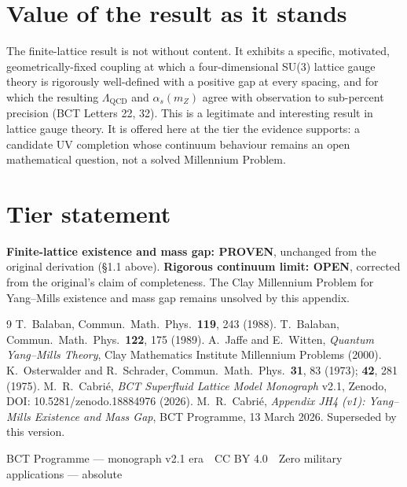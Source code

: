 \documentclass[twocolumn,10pt,a4paper]{article}
\begin{document}
\section{Value of the result as it stands}

The finite-lattice result is not without content. It exhibits a specific,
motivated, geometrically-fixed coupling at which a four-dimensional SU(3)
lattice gauge theory is rigorously well-defined with a positive gap at every
spacing, and for which the resulting $\Lambda_{\mathrm{QCD}}$ and $\alpha_s(m_Z)$
agree with observation to sub-percent precision (BCT Letters 22, 32). This is
a legitimate and interesting result in lattice gauge theory. It is offered
here at the tier the evidence supports: a candidate UV completion whose
continuum behaviour remains an open mathematical question, not a solved
Millennium Problem.

\section*{Tier statement}

\textbf{Finite-lattice existence and mass gap: PROVEN}, unchanged from the
original derivation (\S1.1 above). \textbf{Rigorous continuum limit: OPEN},
corrected from the original's claim of completeness. The Clay Millennium
Problem for Yang--Mills existence and mass gap remains unsolved by this
appendix.

\begin{thebibliography}{9}
 T.~Balaban, Commun.\ Math.\ Phys.\ \textbf{119}, 243 (1988).
 T.~Balaban, Commun.\ Math.\ Phys.\ \textbf{122}, 175 (1989).
 A.~Jaffe and E.~Witten, \emph{Quantum Yang--Mills Theory},
Clay Mathematics Institute Millennium Problems (2000).
 K.~Osterwalder and R.~Schrader, Commun.\ Math.\ Phys.\ \textbf{31},
83 (1973); \textbf{42}, 281 (1975).
 M.~R.~Cabri\'e, \emph{BCT Superfluid Lattice Model
Monograph} v2.1, Zenodo, DOI: 10.5281/zenodo.18884976 (2026).
 M.~R.~Cabri\'e, \emph{Appendix JH4 (v1): Yang--Mills Existence
and Mass Gap}, BCT Programme, 13 March 2026. Superseded by this version.
\end{thebibliography}

\vspace{6pt}
\begin{center}
{\footnotesize BCT Programme --- monograph v2.1 era \,\textperiodcentered\,
CC BY 4.0 \,\textperiodcentered\, Zero military applications --- absolute}
\end{center}
\end{document}
